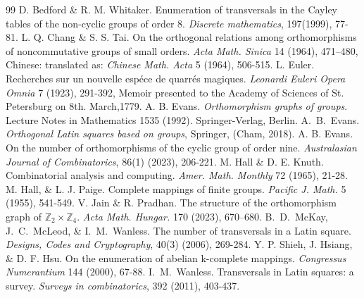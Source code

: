 \documentclass[11pt,a4paper]{article}
\theoremstyle{definition}
\theoremstyle{remark}
\begin{document}
%
	\begin{thebibliography}{99}
		  D. Bedford \&  R. M. Whitaker. Enumeration of transversals in the Cayley tables of the non-cyclic groups of order 8. \textit{Discrete mathematics}, 197(1999), 77-81.
		 L. Q. Chang \& S. S. Tai. On the orthogonal relations among orthomorphisms of noncommutative
		groups of small orders. {\it Acta Math. Sinica} { 
		14} (1964), 471–480, Chinese: translated as: {\it Chinese Math. Acta}  5 (1964), 506-515.
		L. Euler. Recherches sur un nouvelle espéce de quarrés magiques. \textit{Leonardi Euleri Opera Omnia} 7 (1923), 291-392, Memoir presented to the Academy of Sciences of St. Petersburg on 8th. March,1779.
		 A. B. Evans. \textit{Orthomorphism graphs of groups}. Lecture Notes in Mathematics {1535} (1992). Springer-Verlag, Berlin.
		 A.~B.~Evans. {\it Orthogonal Latin squares based on groups}, Springer, (Cham, 2018).
			  A. B. Evans.  On the number of orthomorphisms of the cyclic group of order nine. \textit{Australasian Journal of Combinatorics}, 86(1) (2023), 206-221.
				 M. Hall \& D. E. Knuth. Combinatorial analysis and computing. \textit{Amer. Math. Monthly} 72 (1965), 21-28.
					  M. Hall, \&  L. J. Paige. Complete mappings of finite groups. \textit{Pacific J. Math.} 5 (1955), 541-549.
						 V. Jain \&  R. Pradhan. The structure of the orthomorphism graph of $\mathbb{Z}_{2} \times \mathbb{Z}_{4}$. \textit{Acta Math. Hungar.} 170 (2023), 670–680. 
		 B.~D.~McKay,  J.~C.~McLeod, \&  I.~M.~Wanless. The number of transversals in a Latin square.\textit{ Designs, Codes and Cryptography}, 40(3) (2006), 269-284.
			 Y. P. Shieh,  J. Hsiang, \&  D. F. Hsu. On the enumeration of abelian k-complete mappings.\textit{ Congressus Numerantium} 144 (2000), 67-88.
		  I.~M.~Wanless. Transversals in Latin squares: a survey. \textit{Surveys in combinatorics}, 392 (2011), 403-437.
	
	
	
	
	
		
		
		
	\end{thebibliography}
\end{document}
